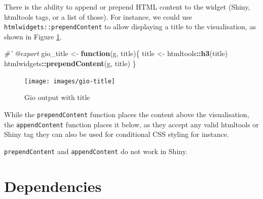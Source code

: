\documentclass[10pt,]{krantz}
\makeatletter
\newenvironment{Shaded}{\begin{snugshade}}{\end{snugshade}}
\newcommand{\CommentTok}[1]{\textcolor[rgb]{0.37,0.37,0.37}{\textit{#1}}}
\newcommand{\ControlFlowTok}[1]{\textcolor[rgb]{0.27,0.27,0.27}{\textbf{#1}}}
\newcommand{\KeywordTok}[1]{\textcolor[rgb]{0.27,0.27,0.27}{\textbf{#1}}}
\newcommand{\NormalTok}[1]{#1}
\newcommand{\OperatorTok}[1]{\textcolor[rgb]{0.43,0.43,0.43}{\textbf{#1}}}
\newcommand{\StringTok}[1]{\textcolor[rgb]{0.5,0.5,0.5}{#1}}
\newenvironment{kframe}{%
\medskip{}
\setlength{\fboxsep}{.8em}
 \def\at@end@of@kframe{}%
 \ifinner\ifhmode%
  \def\at@end@of@kframe{\end{minipage}}%
  \begin{minipage}{\columnwidth}%
 \fi\fi%
 \def\FrameCommand##1{\hskip\@totalleftmargin \hskip-\fboxsep
 \colorbox{shadecolor}{##1}\hskip-\fboxsep
     \hskip-\linewidth \hskip-\@totalleftmargin \hskip\columnwidth}%
 \MakeFramed {\advance\hsize-\width
   \@totalleftmargin\z@ \linewidth\hsize
   \@setminipage}}%
 {\par\unskip\endMakeFramed%
 \at@end@of@kframe}
\renewenvironment{Shaded}{\begin{kframe}}{\end{kframe}}
\newenvironment{rmdblock}[1]
  {
  \begin{itemize}
  \renewcommand{\labelitemi}{
    \raisebox{-.7\height}[0pt][0pt]{
      {\setkeys{Gin}{width=3em,keepaspectratio}\texttt{[image: images/\#1]}}
    }
  }
  \setlength{\fboxsep}{1em}
  \begin{kframe}
  \item
  }
  {
  \end{kframe}
  \end{itemize}
  }
\newenvironment{rmdnote}
  {\begin{rmdblock}{note}}
  {\end{rmdblock}}
\makeatother
\begin{document}
There is the ability to append or prepend HTML content to the widget (Shiny, htmltools tags, or a list of those). For instance, we could use \texttt{htmlwidgets::prependContent} to allow displaying a title to the visualisation, as shown in Figure \ref{fig:gio-title}.

\begin{Shaded}
\begin{Highlighting}[]
\CommentTok{#' @export}
\NormalTok{gio_title <-}\StringTok{ }\ControlFlowTok{function}\NormalTok{(g, title)\{}
\NormalTok{  title <-}\StringTok{ }\NormalTok{htmltools}\OperatorTok{::}\KeywordTok{h3}\NormalTok{(title)}
\NormalTok{  htmlwidgets}\OperatorTok{::}\KeywordTok{prependContent}\NormalTok{(g, title)}
\NormalTok{\}}
\end{Highlighting}
\end{Shaded}

\begin{Shaded}
\end{Shaded}

\begin{figure}[H]

{\centering \texttt{[image: images/gio-title]} 

}

\caption{Gio output with title}\label{fig:gio-title}
\end{figure}

While the \texttt{prependContent} function places the content above the visualisation, the \texttt{appendContent} function places it below, as they accept any valid htmltools or Shiny tag they can also be used for conditional CSS styling for instance.

\begin{rmdnote}
\texttt{prependContent} and \texttt{appendContent} do not work in Shiny.
\end{rmdnote}

\hypertarget{widgets-adv-dependencies}{%
\section{Dependencies}\label{widgets-adv-dependencies}}
\end{document}
